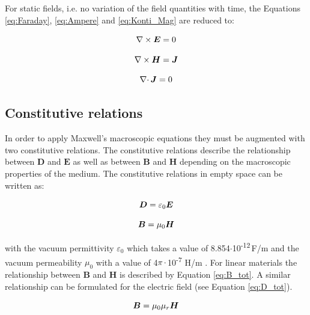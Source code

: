 For static fields, i.e. no variation of the field quantities with time, the Equations \ref{eq:Faraday}, \ref{eq:Ampere} and \ref{eq:Konti_Mag} are reduced to:

\begin{equation}
\label{eq:Faraday_stat}
\centering
\nabla\times\boldsymbol{E} = 0
\end{equation}

\begin{equation}
\label{eq:Ampere_stat}
\centering
\nabla\times\boldsymbol{H} = \boldsymbol{J} 
\end{equation}

\begin{equation}
\label{eq:Konti_Mag_stat}
\centering
\nabla\cdotp\boldsymbol{J} = 0
\end{equation}

\subsection{Constitutive relations}
\label{subsec:const_rel}

In order to apply Maxwell's macroscopic equations they must be augmented with two constitutive relations. The constitutive relations describe the relationship between $\boldsymbol{D}$ and $\boldsymbol{E}$ as well as between $\boldsymbol{B}$ and $\boldsymbol{H}$ depending on the macroscopic properties of the medium. The constitutive relations in empty space can be written as: 

\begin{equation}
\label{eq:disp_const_rel}
\centering
\boldsymbol{D} = \varepsilon_{0}\boldsymbol{E} 
\end{equation}

\begin{equation}
\label{eq:B_vac}
\centering
\boldsymbol{B} = \mu_{0}\boldsymbol{H}
\end{equation}

with the vacuum permittivity $\varepsilon_{0}$ which takes a value of 8.854$\cdotp$10\textsuperscript{-12}\,F/m and the vacuum permeability $\mu_{0}$ with a value of 4$\pi\cdotp$10\textsuperscript{-7} H/m \cite{monk2003finite}\cite{kallenbach2018elektromagnete}. For linear materials the relationship between $\boldsymbol{B}$ and $\boldsymbol{H}$ is described by Equation \ref{eq:B_tot}. A similar relationship can be formulated for the electric field (see Equation \ref{eq:D_tot}).    

\begin{equation}
\label{eq:B_tot}
\centering
\boldsymbol{B} = \mu_{0}\mu_{r}\boldsymbol{H}
\end{equation}

